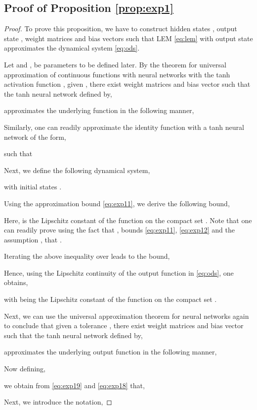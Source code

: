 \documentclass{article} \usepackage{iclr2022_conference,times}
\begin{document}
\subsection{Proof of Proposition \ref{prop:exp1}}
\label{app:exp1pf}
\begin{proof}
To prove this proposition, we have to construct hidden states , output state , weight matrices  and bias vectors  such that LEM \eqref{eq:lem} with output state  approximates the dynamical system \eqref{eq:ods}. 



Let  and , be parameters to be defined later. By the theorem for universal approximation of continuous functions with neural networks with the tanh activation function  \citep{BAR1}, given , there exist weight matrices  and bias vector  such that the tanh neural network defined by,

approximates the underlying function  in the following manner, 

Similarly, one can readily approximate the identity function  with a tanh neural network of the form,

 such that


Next, we define the following dynamical system,

with initial states .

Using the approximation bound \eqref{eq:exp11}, we derive the following bound, 

Here,  is the Lipschitz constant of the function  on the compact set . Note that one can readily prove using the fact that , bounds \eqref{eq:exp11}, \eqref{eq:exp12} and the assumption , that . 


Iterating the above inequality over  leads to the bound,


Hence, using the Lipschitz continuity of the output function  in \eqref{eq:ods}, one obtains,

with  being the Lipschitz constant of the function  on the compact set .

Next, we can use the universal approximation theorem for neural networks again to conclude that given a tolerance , there exist weight matrices  and bias vector  such that the tanh neural network defined by,

approximates the underlying output function  in the following manner, 

Now defining, 

we obtain from \eqref{eq:exp19} and \eqref{eq:exp18} that, 


Next, we introduce the notation, 







\end{proof}
\end{document}
